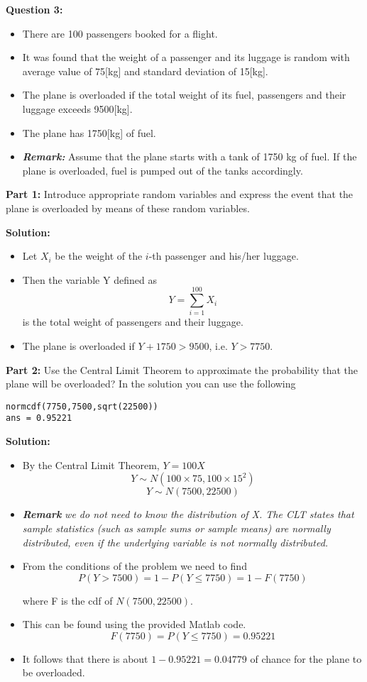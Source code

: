 



\noindent\textbf{Question 3:}\\
\begin{itemize} \item There are 100 passengers booked for a
	flight. \item It was found that the weight of a
	passenger and its luggage is random with average value of 75[kg] and standard deviation of 15[kg].
	\item The plane is overloaded if the total weight of its fuel, passengers and their luggage exceeds 9500[kg].
	\item The plane has 1750[kg] of fuel.
	\item \textbf{\emph{Remark:}} Assume that the plane starts with a tank of 1750 kg of fuel. If the plane is overloaded, fuel is pumped out of the tanks accordingly.
\end{itemize}\bigskip

\noindent\textbf{Part 1:} Introduce appropriate random variables and express the event that the plane is overloaded by means of these random variables.

\noindent\textbf{Solution:}
\begin{itemize}
	\item Let $X_i$ be the weight of the $i$-th passenger and his/her luggage.
	\item Then the variable Y defined as \[ Y = \sum^{100}_{i=1} X_i \] is the
	total weight of passengers and their luggage.
	\item The plane is overloaded if $Y + 1750 > 9500$, i.e. $Y > 7750$.
	
\end{itemize}


\noindent\textbf{Part 2:} Use the Central Limit Theorem to approximate the probability that the plane will be overloaded?
In the solution you can use the following
\begin{verbatim}
normcdf(7750,7500,sqrt(22500))
ans = 0.95221
\end{verbatim}

\noindent\textbf{Solution:}
\begin{itemize}
	\item By the Central Limit Theorem, $Y = 100X $
	\[ Y\sim N(100 \times 75, 100 \times 15^2)  \]
	\[ Y\sim  N(7500, 22500) \]
	\item \textbf{\emph{Remark}}\emph{ we do not need to know the distribution of X. The CLT states that sample statistics (such as sample sums or sample means) are normally distributed, even if the underlying variable is not normally distributed.}
	\item From the conditions of the problem we need to find
	\[P(Y > 7500) = 1 - P(Y \leq 7750) = 1 - F(7750)\]
	
	where F is the cdf of $N(7500, 22500)$.
	
	\item This can be found using the provided Matlab code.
	\[  F(7750) = P(Y \leq 7750) = 0.95221 \]
	\item It follows that there is about $1 - 0.95221 = 0.04779$ of chance for the plane to be overloaded.
\end{itemize}

